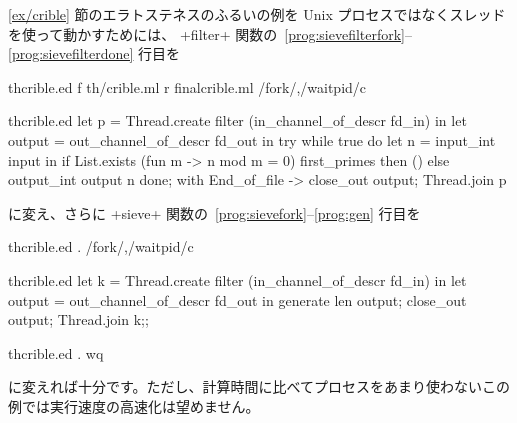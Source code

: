 \begin{example}
\label{ex/crible-copro}
\ref{ex/crible} 節のエラトステネスのふるいの例を Unix プロセスではなくスレッドを使って動かすためには、 \ml+filter+ 関数の~{\ref{prog:sievefilterfork}--\ref{prog:sievefilterdone}} 行目を
%
\begin{codefile}{thcrible.ed}
f th/crible.ml
r finalcrible.ml
/fork/,/waitpid/c
\end{codefile}
%
\begin{listingcodefile}{thcrible.ed}
    let p = Thread.create filter (in_channel_of_descr fd_in) in
    let output = out_channel_of_descr fd_out in
    try
      while true do
        let n = input_int input in
        if List.exists (fun m -> n mod m = 0) first_primes then ()
        else output_int output n
      done;
    with End_of_file ->
      close_out output;
      Thread.join p
\end{listingcodefile}
%
に変え、さらに \ml+sieve+ 関数の~{\ref{prog:sievefork}--\ref{prog:gen}} 行目を
%
\begin{codefile}{thcrible.ed}
.
/fork/,/waitpid/c
\end{codefile}
%
\begin{listingcodefile}{thcrible.ed}
  let k = Thread.create filter (in_channel_of_descr fd_in) in
  let output = out_channel_of_descr fd_out in
  generate len output;
  close_out output;
  Thread.join k;;
\end{listingcodefile}
%
\begin{codefile}{thcrible.ed}
.
wq
\end{codefile}
%
に変えれば十分です。ただし、計算時間に比べてプロセスをあまり使わないこの例では実行速度の高速化は望めません。
\end{example}


